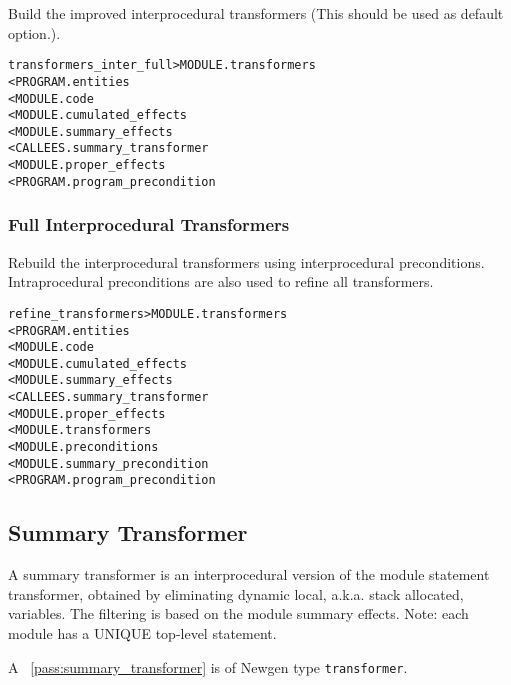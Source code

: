 \documentclass[a4paper]{report}
\newenvironment{PipsMake}{\begin{alltt}}{\end{alltt}}
\newcommand{\PipsPassRef}[1]{\texttt{\detokenize{#1}}~\ref{pass:#1}}
\newenvironment{PipsPass}[1]{\label{pass:#1}}{}
\begin{document}
\begin{PipsPass}{transformers_inter_full}
Build the improved interprocedural transformers (This should be used
as default option.).
\end{PipsPass}

\begin{PipsMake}
transformers_inter_full         > MODULE.transformers
        < PROGRAM.entities
        < MODULE.code
        < MODULE.cumulated_effects
        < MODULE.summary_effects
        < CALLEES.summary_transformer
        < MODULE.proper_effects
        < PROGRAM.program_precondition
\end{PipsMake}

\subsubsection{Full Interprocedural Transformers}

\begin{PipsPass}{refine_transformers}
Rebuild the interprocedural transformers using interprocedural
preconditions. Intraprocedural preconditions are also used to refine all
transformers.
\end{PipsPass}

\begin{PipsMake}
refine_transformers         > MODULE.transformers
        < PROGRAM.entities
        < MODULE.code
        < MODULE.cumulated_effects
        < MODULE.summary_effects
        < CALLEES.summary_transformer
        < MODULE.proper_effects
        < MODULE.transformers
        < MODULE.preconditions
        < MODULE.summary_precondition
        < PROGRAM.program_precondition
\end{PipsMake}

\subsection{Summary Transformer}
\label{subsubsection-summary-transformer}

\begin{PipsPass}{summary_transformer}
A summary transformer is an interprocedural version of the module
statement transformer, obtained by eliminating dynamic local,
a.k.a. stack allocated, variables. The filtering is based on the
module summary effects.
\end{PipsPass}
Note: each module has a UNIQUE top-level
statement.

A \PipsPassRef{summary_transformer} is of Newgen type \texttt{transformer}.
\end{document}
